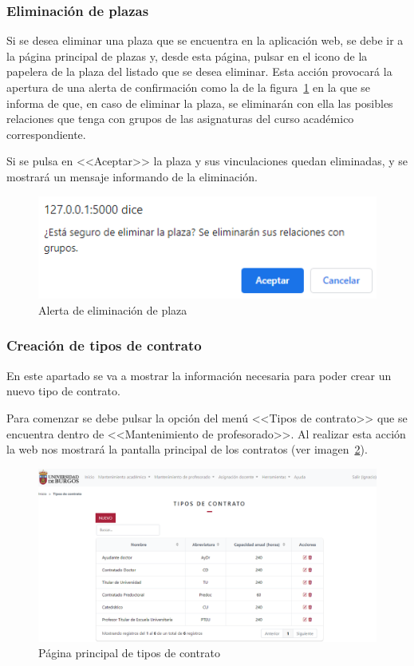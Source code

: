 \subsubsection{Eliminación de plazas}
Si se desea eliminar una plaza que se encuentra en la aplicación web, se debe ir a la página principal de plazas y, desde esta página, pulsar en el icono de la papelera de la plaza del listado que se desea eliminar.
Esta acción provocará la apertura de una alerta de confirmación como la de la figura~\ref{pag:alertElPlaza} en la que se informa de que, en caso de eliminar la plaza, se eliminarán con ella las posibles relaciones que tenga con grupos de las asignaturas del curso académico correspondiente.

Si se pulsa en <<Aceptar>> la plaza y sus vinculaciones quedan eliminadas, y se mostrará un mensaje informando de la eliminación.

\begin{figure}
	\centering
	\includegraphics[width=.65\textwidth]{../img/Anexos/Manual usuario/alertElPlaza.png}
	\caption{Alerta de eliminación de plaza}\label{pag:alertElPlaza}
\end{figure}

\subsubsection{Creación de tipos de contrato}
En este apartado se va a mostrar la información necesaria para poder crear un nuevo tipo de contrato.

Para comenzar se debe pulsar la opción del menú <<Tipos de contrato>> que se encuentra dentro de <<Mantenimiento de profesorado>>.
Al realizar esta acción la web nos mostrará la pantalla principal de los contratos (ver imagen~\ref{pag:contratos}).

\begin{figure}
	\centering
	\includegraphics[width=\textwidth]{../img/Anexos/Manual usuario/contratos.png}
	\caption{Página principal de tipos de contrato}\label{pag:contratos}
\end{figure}

